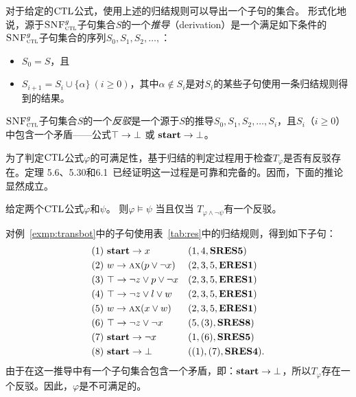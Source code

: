 对于给定的$\textrm{CTL}$公式，使用上述的归结规则可以导出一个子句的集合。
形式化地说，源于${\textsc{SNF}_{\textsc{ctl}}^g}$子句集合$S$的一个\emph{推导}（derivation）是一个满足如下条件的${\textsc{SNF}_{\textsc{ctl}}^g}$子句集合的序列$S_0, S_1, S_2, \ldots, $：
\begin{itemize}
	\item $S_0=S$，且
	\item $S_{i+1} = S_i\cup \{\alpha\}~(i\ge 0)$，其中$\alpha\notin S_i$是对$S_i$的某些子句使用一条归结规则得到的结果。
\end{itemize}

${\textsc{SNF}_{\textsc{ctl}}^g}$子句集合$S$的一个\emph{反驳}是一个源于$S$的推导$S_0, S_1, S_2, \ldots, S_i$，且$S_i$（$i\geq 0$）中包含一个矛盾——公式$\top\rightarrow\bot$ 或 $\textbf{start}\rightarrow\bot$。

为了判定$\textrm{CTL}$公式$\varphi$的可满足性，基于归结的判定过程用于检查$T_{\varphi}$是否有反驳存在。定理 5.6、5.30和6.1~\cite{zhang2014resolution}已经证明这一过程是可靠和完备的。因而，下面的推论显然成立。
\begin{corollary}
	给定两个$\textrm{CTL}$公式$\varphi$和$\psi$。 则$\varphi\models\psi$ 当且仅当 $T_{\varphi\land\neg\psi}$有一个反驳。
\end{corollary}

\begin{example}\label{exmp:resbot}
	对例~\ref{exmp:transbot}中的子句使用表~\ref{tab:res}中的归结规则，得到如下子句：
	\begin{align*}
		&(1)\ \textbf{start} \rightarrow x  && (1, 4, \textbf{SRES5})\\
		&(2)\ w \rightarrow \textsc{a}\textsc{x} (p \vee \neg x) && (2, 3,5,\textbf{ERES1})\\
		&(3)\ \top \rightarrow  \neg z \vee p \vee \neg x  && (2, 3,5,\textbf{ERES1})\\
		&(4)\ \top \rightarrow \neg z \vee l \vee w && (2, 3,5,\textbf{ERES1})\\
		&(5)\ w \rightarrow \textsc{a} \textsc{x}(x \vee w) && (2, 3,5,\textbf{ERES1})\\
		&(6)\ \top \rightarrow \neg z \vee \neg x && (5, (3), \textbf{SRES8})\\
		&(7)\ \textbf{start} \rightarrow \neg x && (1, (6), \textbf{SRES5}) \\
		&(8)\ \textbf{start} \rightarrow \bot && ((1), (7), \textbf{SRES4}).
	\end{align*}
	由于在这一推导中有一个子句集合包含一个矛盾，即：$\textbf{start} \rightarrow \bot$，所以$T_{\varphi}$存在一个反驳。因此，$\varphi$是不可满足的。
\end{example}


